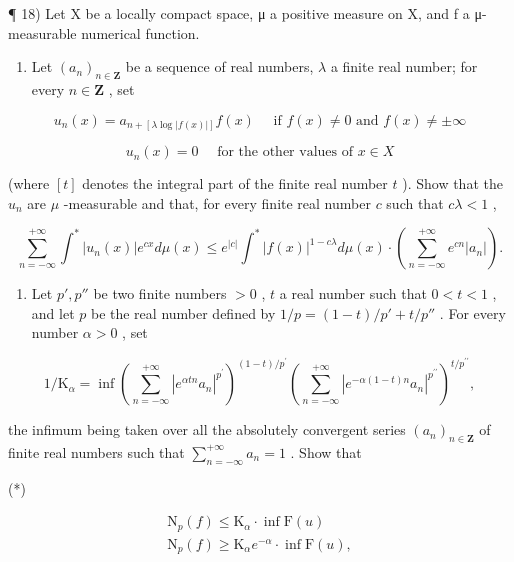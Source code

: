 ¶ 18) Let X be a locally compact space, μ a positive measure on X, and f a μ-measurable numerical function.

\begin{enumerate}
\def\labelenumi{\alph{enumi})}
\tightlist
\item
  Let \((a_{n})_{n\in \mathbf{Z}}\) be a sequence of real numbers, \(\lambda\) a finite real number; for every \(n\in \mathbf{Z}\) , set
\end{enumerate}

\[
u _ {n} (x) = a _ {n + [ \lambda \log | f (x) | ]} f (x) \quad \text { if } f (x) \neq 0 \text { and } f (x) \neq \pm \infty
\]

\[
u _ {n} (x) = 0 \quad \text {   for   the   other   values   of   } x \in X
\]

(where \([t]\) denotes the integral part of the finite real number \(t\) ). Show that the \(u_{n}\) are \(\mu\) -measurable and that, for every finite real number \(c\) such that \(c\lambda < 1\) ,

\[
\sum_ {n = - \infty} ^ {+ \infty} \int^ {*} | u _ {n} (x) | e ^ {c x} d \mu (x) \leqslant e ^ {| c |} \int^ {*} | f (x) | ^ {1 - c \lambda} d \mu (x) \cdot \left(\sum_ {n = - \infty} ^ {+ \infty} e ^ {c n} | a _ {n} |\right).
\]

\begin{enumerate}
\def\labelenumi{\alph{enumi})}
\setcounter{enumi}{1}
\tightlist
\item
  Let \(p', p''\) be two finite numbers \(> 0\) , \(t\) a real number such that \(0 < t < 1\) , and let \(p\) be the real number defined by \(1/p = (1 - t)/p' + t/p''\) . For every number \(\alpha > 0\) , set
\end{enumerate}

\[
1 / \mathrm{K} _ {\alpha} = \inf \left(\sum_ {n = - \infty} ^ {+ \infty} | e ^ {\alpha t n} a _ {n} | ^ {p ^ {\prime}}\right) ^ {(1 - t) / p ^ {\prime}} \left(\sum_ {n = - \infty} ^ {+ \infty} | e ^ {- \alpha (1 - t) n} a _ {n} | ^ {p ^ {\prime \prime}}\right) ^ {t / p ^ {\prime \prime}},
\]

the infimum being taken over all the absolutely convergent series \((a_{n})_{n\in \mathbf{Z}}\) of finite real numbers such that \(\sum_{n = -\infty}^{+\infty}a_n = 1\) . Show that

(*)

\[
\begin{array}{l} \mathrm{N} _ {p} (f) \leqslant \mathrm{K} _ {\alpha} \cdot \inf \mathrm{F} (u) \\ \mathrm{N} _ {p} (f) \geqslant \mathrm{K} _ {\alpha} e ^ {- \alpha} \cdot \inf \mathrm{F} (u), \end{array}\tag{**}
\]

